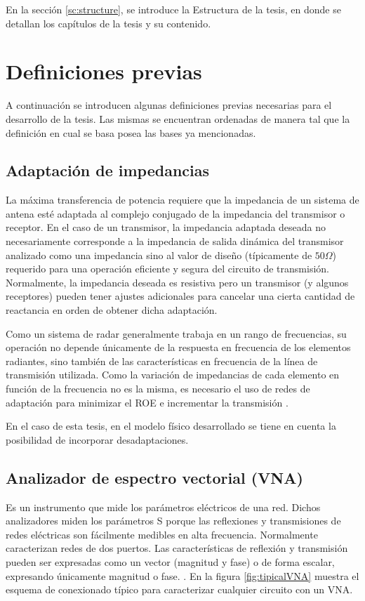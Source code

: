En la sección \ref{sc:structure}, se introduce la Estructura de la tesis, en donde se detallan los capítulos de la tesis y su
contenido.


\section{Definiciones previas} \label{sc:definitions}

A continuación se introducen algunas definiciones previas necesarias para el desarrollo de la tesis. Las mismas se encuentran
ordenadas de manera tal que la definición en cual se basa posea las bases ya mencionadas.


\subsection{Adaptación de impedancias}
La máxima transferencia de potencia requiere que la impedancia de un sistema de antena esté adaptada al complejo conjugado de la
impedancia del transmisor o receptor. En el caso de un transmisor, la impedancia adaptada deseada no necesariamente corresponde a
la impedancia de salida dinámica del transmisor analizado como una impedancia sino al valor de diseño (típicamente de
$50 \Omega$) requerido para una operación eficiente y segura del circuito de transmisión. Normalmente, la impedancia deseada es
resistiva pero un transmisor (y algunos receptores) pueden tener ajustes adicionales para cancelar una cierta cantidad de
reactancia en orden de obtener dicha adaptación.

Como un sistema de radar generalmente trabaja en un rango de frecuencias, su operación no depende únicamente de la respuesta en
frecuencia de los elementos radiantes, sino también de las características en frecuencia de la línea de transmisión utilizada.
Como la variación de impedancias de cada elemento en función de la frecuencia no es la misma, es necesario el uso de redes de
adaptación para minimizar el ROE e incrementar la transmisión \cite{Balanis2012}.

En el caso de esta tesis, en el modelo físico desarrollado se tiene en cuenta la posibilidad de incorporar desadaptaciones.


\subsection{Analizador de espectro vectorial (VNA)}

Es un instrumento que mide los parámetros eléctricos de una red. Dichos analizadores miden los parámetros S porque las
reflexiones y transmisiones de redes eléctricas son fácilmente medibles en alta frecuencia. Normalmente caracterizan redes de
dos puertos. Las características de reflexión y transmisión pueden ser expresadas como un vector (magnitud y fase) o de forma
escalar, expresando únicamente magnitud o fase. \cite{AgilentTechnologies2012}. En la figura \ref{fig:tipicalVNA} muestra el
esquema de conexionado típico para caracterizar cualquier circuito con un VNA.

